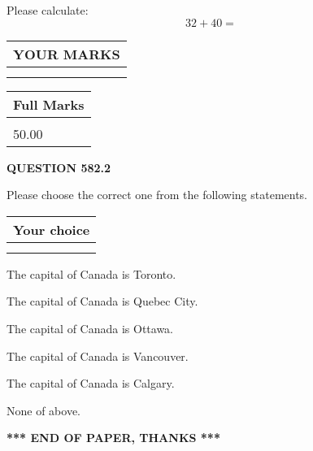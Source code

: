 \documentclass[12pt]{article}
\begin{document}
  
 
Please calculate:
\begin{equation}
32 +  %
40 = \nonumber
\end{equation}
 

 

 
  
\vspace{0.2in}
  
\noindent\begin{tabular}{|l|}
\hline
 YOUR MARKS  \\
\hline
 \\ 
 \\ 
\hline
\end{tabular}
\hspace{0.05in} \begin{tabular}{|l|}
\hline
 Full Marks  \\
\hline
 \\ 
50.00 \\
\hline
\end{tabular}
{\textbf{\Large{QUESTION
582.2 
}}}
  
  
Please choose the correct one from the following statements.
  
  
\noindent\hspace{3.0in} \begin{tabular}{|l|}
\hline
Your choice \\
\hline
 \\ 
 \\ 
\hline
\end{tabular}
  
  
 
 
The capital of Canada is Toronto.
 
 
The capital of Canada is Quebec City.
 
 
The capital of Canada is Ottawa.
 
 
The capital of Canada is Vancouver.
 
 
The capital of Canada is Calgary.
 
 
 None of above.
 
 
   
   
 \vspace{0.2in}
 
   
   
   
   
\vspace{1.0in} 
{\textbf{\large{ *** END OF PAPER, THANKS *** }}} 
   
\end{document}
